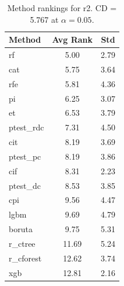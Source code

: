 \begin{table}[h]
\centering
\caption{Method rankings for r2. CD = 5.767 at $\alpha=0.05$.}
\label{tab:ranks_r2}
\begin{tabular}{lcc}
\toprule
Method & Avg Rank & Std \\
\midrule
rf & 5.00 & 2.79 \\
cat & 5.75 & 3.64 \\
rfe & 5.81 & 4.36 \\
pi & 6.25 & 3.07 \\
et & 6.53 & 3.79 \\
ptest_rdc & 7.31 & 4.50 \\
cit & 8.19 & 3.69 \\
ptest_pc & 8.19 & 3.86 \\
cif & 8.31 & 2.23 \\
ptest_dc & 8.53 & 3.85 \\
cpi & 9.56 & 4.47 \\
lgbm & 9.69 & 4.79 \\
boruta & 9.75 & 5.31 \\
r_ctree & 11.69 & 5.24 \\
r_cforest & 12.62 & 3.74 \\
xgb & 12.81 & 2.16 \\
\bottomrule
\end{tabular}
\end{table}
